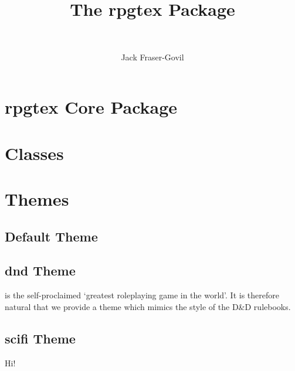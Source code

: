 \documentclass[11pt,theme=default]{rpgbook}
\title{The rpgtex Package}
\subtitle{~}
\author{Jack Fraser-Govil}
\begin{document}
	\frontmatter
	\maketitle{}

	\tableofcontents
	\mainmatter{}


	\part{rpgtex Core Package}

	\part{Classes}
		\chapter{}
	\part{Themes}
	\chapter{Default Theme}

		\chapter{dnd Theme}

			 is the self-proclaimed `greatest roleplaying game in the world'. It is therefore natural that we provide a theme which mimics the style of the D\&D rulebooks. \blindtext{}

	\chapter{scifi Theme}
		Hi!
\end{document}
